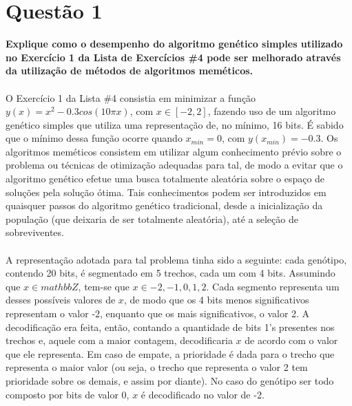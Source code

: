\documentclass{report}
\begin{document}


\section*{Questão 1}

\textbf{Explique como o desempenho do algoritmo genético simples utilizado no Exercício 1 da Lista de Exercícios \#4 pode ser melhorado através da utilização de métodos de algoritmos meméticos.}

\paragraph{} O Exercício 1 da Lista \#4 consistia em minimizar a função $y(x) = x^2 - 0.3 cos(10\pi x)$, com $x \in [-2, 2]$, fazendo uso de um algoritmo genético simples que utiliza uma representação de, no mínimo, 16 bits. É sabido que o mínimo dessa função ocorre quando $x_{min} = 0$, com $y(x_{min}) = -0.3$. Os algoritmos meméticos consistem em utilizar algum conhecimento prévio sobre o problema ou técnicas de otimização adequadas para tal, de modo a evitar que o algoritmo genético efetue uma busca totalmente aleatória sobre o espaço de soluções pela solução ótima. Tais conhecimentos podem ser introduzidos em quaisquer passos do algoritmo genético tradicional, desde a inicialização da população (que deixaria de ser totalmente aleatória), até a seleção de sobreviventes.\\

\paragraph{} A representação adotada para tal problema tinha sido a seguinte: cada genótipo, contendo 20 bits, é segmentado em 5 trechos, cada um com 4 bits. Assumindo que $x \in mathbb{Z}$, tem-se que $x \in {-2, -1, 0, 1, 2}$. Cada segmento representa um desses possíveis valores de $x$, de modo que os 4 bits menos significativos representam o valor -2, enquanto que os mais significativos, o valor 2. A decodificação era feita, então, contando a quantidade de bits 1's presentes nos trechos e, aquele com a maior contagem, decodificaria $x$ de acordo com o valor que ele representa. Em caso de empate, a prioridade é dada para o trecho que representa o maior valor (ou seja, o trecho que representa o valor 2 tem prioridade sobre os demais, e assim por diante). No caso do genótipo ser todo composto por bits de valor 0, $x$ é decodificado no valor de -2.\\
\end{document}

